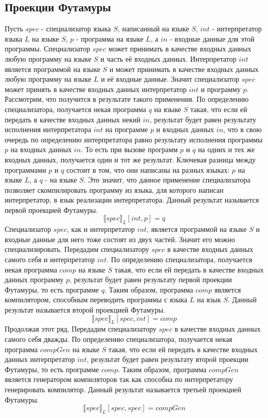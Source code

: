 \documentclass{spbau-diploma}
\begin{document}
\subsection{ Проекции Футамуры}
Пусть $spec$ - специализатор языка $S$, написанный на языке $S$, $int$ - интерпретатор языка $L$ на языке $S$, $p$ - программа на языке $L$, а $in$ - входные данные для этой программы. Специализатор $spec$ может принимать в качестве входных данных любую программу на языке $S$ и часть её входных данных. Интерпретатор $int$ является программой на языке $S$ и может принимать в качестве входных данных любую программу на языке $L$ и её входные данные. Значит специализатор $spec$ может принять в качестве входных данных интерпретатор $int$ и программу $p$. Рассмотрим, что получится в результате такого применения. По определению специализатора, получается некая программа $q$ на языке $S$ такая, что если ей передать в качестве входных данных некий $in$, результат будет равен результату исполнения интерпретатора $int$ на программе $p$ и входных данных $in$, что в свою очередь по определению интерпретатора равно результату исполнения программы $p$ на входных данных $in$. То есть при вызове программ $p$ и $q$ на одних и тех же входных данных, получается один и тот же результат. Ключевая разница между программами $p$ и $q$ состоит в том, что они написаны на разных языках: $p$ на языке $L$, а $q$ - на языке $S$. Это значит, что данное применение специализатора позволяет скомпилировать программу из языка, для которого написан интерпретатор, в язык реализации интерпретатора. Данный результат называется первой проекцией Футамуры.
    $$
        \llbracket spec \rrbracket_L [int, p] = q
    $$
Специализатор $spec$, как и интерпретатор $int$, является программой на языке $S$ и входные данные для него тоже состоят из двух частей. Значит его можно специализировать. Передадим специализатору $spec$ в качестве входных данных самого себя и интерпретатор $int$. По определению специализатора, получается некая программа $comp$ на языке $S$ такая, что если ей передать в качестве входных данных программу $p$, результат будет равен результату первой проекции Футамуры, то есть программе $q$. Таким образом, программа $comp$ является компилятором, способным переводить программы с языка $L$ на язык $S$. Данный результат называется второй проекцией Футамуры.
    $$
        \llbracket spec \rrbracket_L [spec, int] = comp
    $$
Продолжая этот ряд, Передадим специализатору $spec$ в качестве входных данных самого себя дважды. По определению специализатора, получается некая программа $compGen$ на языке $S$ такая, что если ей передать в качестве входных данных интерпретатор $int$, результат будет равен результату второй проекции Футамуры, то есть программе $comp$. Таким образом, программа $compGen$ является генератором компиляторов так как способна по интерпретатору генерировать компилятор. Данный результат называется третьей проекцией Футамуры. 
    $$
        \llbracket spec \rrbracket_L [spec, spec] = compGen
    $$
\end{document}
